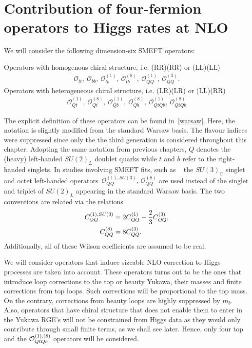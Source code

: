 \section{Contribution of four-fermion operators to Higgs rates at NLO \label{sec:HiggsCalc}}
We will consider the following dimension-six SMEFT operators:
%
\begin{tcolorbox}[title=Four-Heavy-quark SMEFT operators modifying Higgs rates at NLO,
	title filled=false,
	colback=Mahogany!5!white,
	colframe=Mahogany ]
	Operators with homogenous chiral structure, i.e.  (RR)(RR) or (LL)(LL)
	\begin{align}
	\mathcal{O}_{tt},\  \mathcal{O}_{bb},\ \mathcal{O}_{tb}^{(1)}, \ \mathcal{O}_{tb}^{(8)}, \  \mathcal{O}_{QQ}^{(1)},\   \mathcal{O}_{QQ}^{(3)}.
		\label{box:heavyq}
	\end{align}
	Operators with heterogeneous chiral structure, i.e.  (LR)(LR) or (LL)(RR)
		\begin{align}
		\mathcal{O}_{Qt}^{(1)},\ \mathcal{O}_{Qt}^{(8)},\ \mathcal{O}_{Qb}^{(1)},\ \mathcal{O}_{Qb}^{(8)},\ \mathcal{O}^{(1)}_{QtQb},\ \mathcal{O}^{(8)}_{QtQb}
\label{box:heavyqs}
\end{align}
\end{tcolorbox}
The explicit definition of these operators can be found in~\autoref{warsaw}. Here, the notation is slightly modified from the standard Warsaw basis. The flavour indices were suppressed since only the the third generation is considered throughout this chapter. Adopting the same notation from previous chapters, $Q$ denotes the (heavy) left-handed  $SU(2)_L$ doublet quarks while  $t$ and $b$ refer to the right-handed singlets.  In studies involving SMEFT fits, such as ~\cite{Ethier:2021bye} the $SU(3)_C$ singlet and octet left-handed operators~$\mathcal{O}_{QQ}^{(1),SU(3)},\,\mathcal{O}_{QQ}^{(8)}$ are used instead of the singlet and triplet of $SU(2)_L$ appearing in the standard Warsaw basis. The two conventions are related via the relations
\begin{align}
C_{QQ}^{(1),SU(3)} &= 2 C_{QQ}^{(1)} -\frac{2}{3} C_{QQ}^{(3)}, \nonumber \\
C_{QQ}^{(8)} &= 8 C_{QQ}^{(3)}.
\end{align}
Additionally, all of these Wilson coefficients are assumed to be real.\\
\par  We will consider operators that induce sizeable NLO correction to Higgs processes are taken into account. These operators turns out to be the ones that introduce loop corrections to the top or beauty Yukawa, their masses and finite corrections from top loops. Such corrections will be proportional to the top mass. On the contrary, corrections from beauty loops are highly suppressed by $m_b$. Also, operators that have chiral structure that does not enable them to enter in the Yukawa RGE's will not be constrained from Higgs data as they would only contribute through small finite terms, as we shall see later.  Hence, only four top and the  ${\cal O}_{QtQb}^{(1),(8)}$ operators will be considered.

